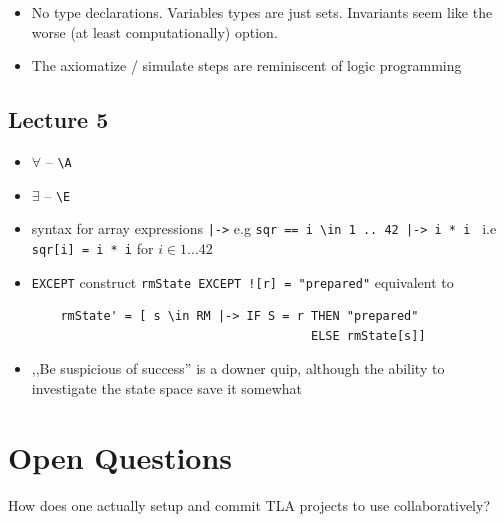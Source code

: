 \documentclass[11pt]{article}
\begin{document}
\begin{itemize}
  \item { No type declarations. Variables types are just sets. Invariants seem
  like the worse (at least computationally) option. }
  \item { The axiomatize / simulate steps are reminiscent of logic programming }
\end{itemize}
\subsection*{Lecture 5}

\begin{itemize}
  \item { $\forall$ -- \texttt{\textbackslash A}}
  \item { $\exists$ -- \texttt{\textbackslash E}}
  \item { syntax for array expressions \texttt{|->} e.g \texttt{sqr == i
  \textbackslash in 1 .. 42 |-> i * i } i.e \texttt{sqr[i] = i * i} for $i  \in
  1 \ldots 42$ }
  \item { \texttt{EXCEPT} construct \texttt{rmState EXCEPT ![r] = "prepared"}
  equivalent to
  \begin{verbatim}
    rmState' = [ s \in RM |-> IF S = r THEN "prepared"
                                       ELSE rmState[s]]
  \end{verbatim}
  }
  \item { ,,Be suspicious of success'' is a downer quip, although the ability to
  investigate the state space save it somewhat }
\end{itemize}


\section*{Open Questions}

How does one actually setup and commit TLA projects to use collaboratively? 
\end{document}
